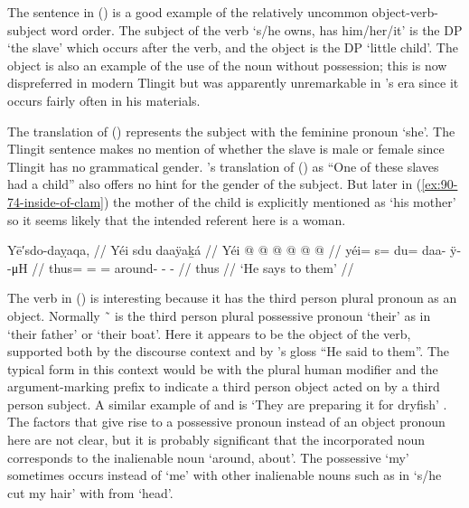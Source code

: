 The sentence in (\lastx) is a good example of the relatively uncommon object-verb-subject word order.
The subject of the verb  ‘s/he owns, has him/her/it’ is the DP  ‘the slave’ which occurs after the verb, and the object is the DP  ‘little child’.
The object is also an example of the use of the noun  without possession; this is now dispreferred in modern Tlingit but was apparently unremarkable in \citeauthor{swanton:1909}’s era since it occurs fairly often in his materials.

The translation of (\lastx) represents the subject with the feminine pronoun ‘she’.
The Tlingit sentence makes no mention of whether the slave is male or female since Tlingit has no grammatical gender.
\citeauthor{swanton:1909}’s translation of (\lastx) as “One of these slaves had a child” also offers no hint for the gender of the subject.
But later in (\ref{ex:90-74-inside-of-clam}) the mother of the child is explicitly mentioned as  ‘his mother’ so it seems likely that the intended referent here is a woman.

\ex\label{ex:90-60-says-to-them}%
%
\begingl
	\glpreamble	Yē′sdo-daỵaqa, //
	\glpreamble	Yéi sdu daaÿaḵá //
	\gla	Yéi @  @ {} @  @ {} @ {} @ {} //
	\glb	yéi= s= du= daa- ÿ-  -μH //
	\glc	thus= = = around- -  - //
	\gld	thus  {}  {} {} {} //
	\glft	‘He says to them’
		//
\endgl
\xe

The verb in (\lastx) is interesting because it has the third person plural pronoun  as an object.
Normally  \~\  is the third person plural possessive pronoun ‘their’ as in  ‘their father’ or  ‘their boat’.
Here it appears to be the object of the verb, supported both by the discourse context and by \citeauthor{swanton:1909}’s gloss “He said to them”.
The typical form in this context would be  with the plural human modifier  and the argument-marking prefix  to indicate a third person object acted on by a third person subject.
A similar example of  and  is  ‘They are preparing it for dryfish’ \parencite[201.133]{dauenhauer:1987}.
The factors that give rise to a possessive pronoun instead of an object pronoun here are not clear, but it is probably significant that the incorporated noun  corresponds to the inalienable noun  ‘around, about’.
The possessive  ‘my’ sometimes occurs instead of  ‘me’ with other inalienable nouns such as in  ‘s/he cut my hair’ with  from  ‘head’.


